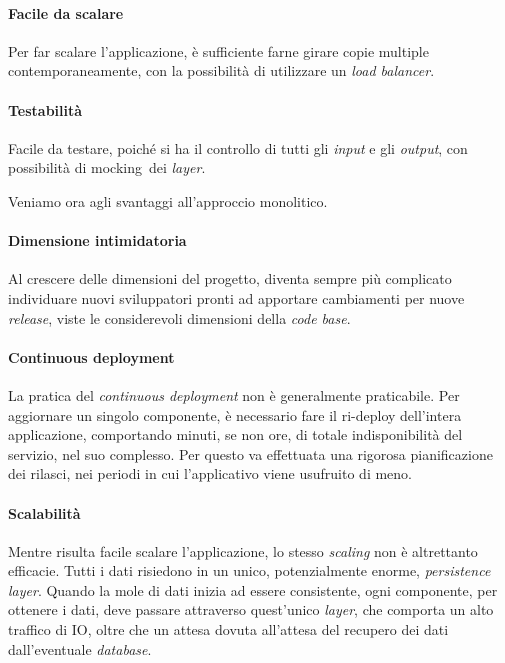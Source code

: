 \paragraph*{Facile da scalare} Per far scalare l'applicazione, è sufficiente farne girare copie multiple contemporaneamente, con la possibilità di utilizzare un \textit{load balancer}.

\paragraph*{Testabilità} Facile da testare, poiché si ha il controllo di tutti gli \textit{input} e gli \textit{output}, con possibilità di \gls{mocking}\gloss\ dei \textit{layer}.

\bigskip
Veniamo ora agli svantaggi all'approccio monolitico.

\paragraph*{Dimensione intimidatoria} Al crescere delle dimensioni del progetto, diventa sempre più complicato individuare nuovi sviluppatori pronti ad apportare cambiamenti per nuove \textit{release},
viste le considerevoli dimensioni della \textit{code base}.

\paragraph*{Continuous deployment} La pratica del \textit{continuous deployment} non è generalmente praticabile.
Per aggiornare un singolo componente, è necessario fare il ri-\gls{deploy} dell'intera applicazione, comportando minuti, se non ore, di totale indisponibilità del
servizio, nel suo complesso.
Per questo va effettuata una rigorosa pianificazione dei rilasci, nei periodi in cui l'applicativo viene usufruito di meno.

\paragraph*{Scalabilità} Mentre risulta facile scalare l'applicazione, lo stesso \textit{scaling} non è altrettanto efficacie. Tutti i dati risiedono in un unico, potenzialmente
enorme, \textit{persistence layer}. Quando la mole di dati inizia ad essere
consistente, ogni componente, per ottenere i dati, deve passare attraverso quest'unico \textit{layer}, che comporta un alto traffico di IO, oltre che un attesa dovuta all'attesa del recupero dei dati dall'eventuale \textit{database}.


